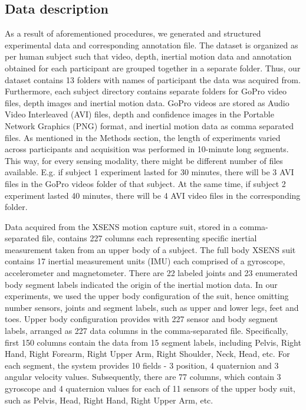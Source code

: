 \documentclass[journal]{IEEEtran}
\begin{document}
\subsection{Data description}

As a result of aforementioned procedures, we generated and structured experimental data and corresponding annotation file. The dataset is organized as per human subject such that video, depth, inertial motion data and annotation obtained for each participant are grouped together in a separate folder. Thus, our dataset contains 13 folders with names of participant the data was acquired from. Furthermore, each subject directory contains separate folders for GoPro video files, depth images and inertial motion data. GoPro videos are stored as Audio Video Interleaved (AVI) files, depth and confidence images in the Portable Network Graphics (PNG) format, and inertial motion data as comma separated files. As mentioned in the Methods section, the length of experiments varied across participants and acquisition was performed in 10-minute long segments. This way, for every sensing modality, there might be different number of files available. E.g. if subject 1 experiment lasted for 30 minutes, there will be 3 AVI files in the GoPro videos folder of that subject. At the same time, if subject 2 experiment lasted 40 minutes, there will be 4 AVI video files in the corresponding folder. 

Data acquired from the XSENS motion capture suit, stored in a comma-separated file, contains 227 columns each representing specific inertial measurement taken from an upper body of a subject. The full body XSENS suit contains 17 inertial measurement units (IMU) each comprised of a gyroscope, accelerometer and magnetometer.  There are 22 labeled joints and 23 enumerated body segment labels indicated the origin of the inertial motion data. In our experiments, we used the upper body configuration of the suit, hence omitting number sensors, joints and segment labels, such as upper and lower legs, feet and toes. Upper body configuration provides with 227 sensor and body segment labels, arranged as 227 data columns in the comma-separated file. Specifically, first 150 columns contain the data from 15 segment labels, including Pelvis, Right Hand, Right Forearm, Right Upper Arm, Right Shoulder, Neck, Head, etc. For each segment, the system provides 10 fields - 3 position, 4 quaternion and 3 angular velocity values. Subsequently, there are 77 columns, which contain 3 gyroscope and 4 quaternion values for each of 11 sensors of the upper body suit, such as Pelvis, Head, Right Hand, Right Upper Arm, etc. 
\end{document}
